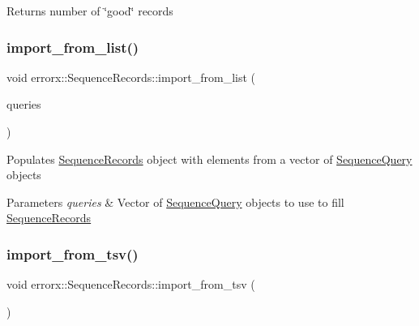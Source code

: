 \begin{DoxyReturn}{Returns}
number of \char`\"{}good\char`\"{} records 
\end{DoxyReturn}
\mbox{\label{classerrorx_1_1_sequence_records_a3fd1286256f256644c06413bb705df88}} 
\subsubsection{\texorpdfstring{import\+\_\+from\+\_\+list()}{import\_from\_list()}}
{\footnotesize\ttfamily void errorx\+::\+Sequence\+Records\+::import\+\_\+from\+\_\+list (\begin{DoxyParamCaption}\item[{vector$<$ \mbox{\hyperlink{classerrorx_1_1_sequence_query}{Sequence\+Query}} $>$ \&}]{queries }\end{DoxyParamCaption})}

Populates \mbox{\hyperlink{classerrorx_1_1_sequence_records}{Sequence\+Records}} object with elements from a vector of \mbox{\hyperlink{classerrorx_1_1_sequence_query}{Sequence\+Query}} objects


\begin{DoxyParams}{Parameters}
{\em queries} & Vector of \mbox{\hyperlink{classerrorx_1_1_sequence_query}{Sequence\+Query}} objects to use to fill \mbox{\hyperlink{classerrorx_1_1_sequence_records}{Sequence\+Records}} \\
\hline
\end{DoxyParams}
\mbox{\label{classerrorx_1_1_sequence_records_acc6c04160f2584ae83ed7636104aadaf}} 
\subsubsection{\texorpdfstring{import\+\_\+from\+\_\+tsv()}{import\_from\_tsv()}}
{\footnotesize\ttfamily void errorx\+::\+Sequence\+Records\+::import\+\_\+from\+\_\+tsv (\begin{DoxyParamCaption}{ }\end{DoxyParamCaption})}

